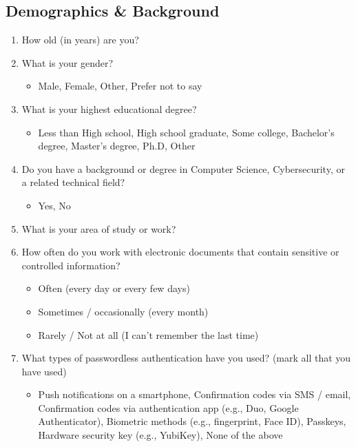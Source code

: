 \subsection*{Demographics \& Background}
\begin{enumerate}
    \item How old (in years) are you?
    \item What is your gender?
    \begin{itemize}
        \item Male, Female, Other, Prefer not to say
    \end{itemize}
    \item What is your highest educational degree?
    \begin{itemize}
        \item Less than High school, High school graduate, Some college, Bachelor's degree, Master's degree, Ph.D, Other
    \end{itemize}
    \item Do you have a background or degree in Computer Science, Cybersecurity, or a related technical field?
    \begin{itemize}
        \item Yes, No
    \end{itemize}
    \item What is your area of study or work?
    \item How often do you work with electronic documents that contain sensitive or controlled information?
    \begin{itemize}
        \item Often (every day or every few days)
        \item Sometimes / occasionally (every month)
        \item Rarely / Not at all (I can't remember the last time)
    \end{itemize}
    \item What types of passwordless authentication have you used? (mark all that you have used)
    \begin{itemize}
        \item Push notifications on a smartphone, Confirmation codes via SMS / email, Confirmation codes via authentication app (e.g., Duo, Google Authenticator), Biometric methods (e.g., fingerprint, Face ID), Passkeys, Hardware security key (e.g., YubiKey), None of the above
    \end{itemize}
\end{enumerate}

